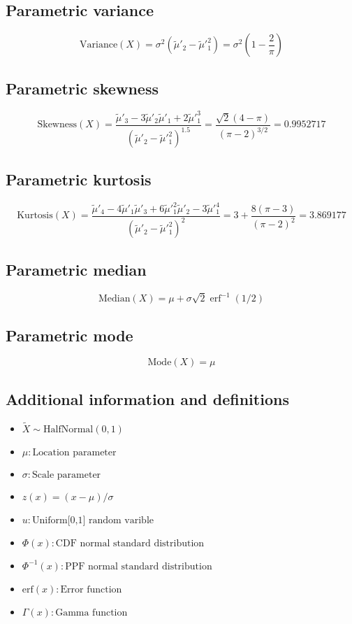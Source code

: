 \documentclass{article}
\begin{document}
\subsection{Parametric variance}
\begin{equation*} \mathrm{Variance}(X)=\sigma^{2}(\tilde{\mu}'_{2}-\tilde{\mu}'^{2}_{1})=\sigma^2\left(1-\frac 2 \pi\right) \end{equation*}
\subsection{Parametric skewness}
\begin{equation*} \mathrm{Skewness}(X)=\frac{\tilde{\mu}'_{3}-3\tilde{\mu}'_{2}\tilde{\mu}'_{1}+2\tilde{\mu}'^{3}_{1}}{(\tilde{\mu}'_{2}-\tilde{\mu}'^{2}_{1})^{1.5}}=\frac{\sqrt{2}(4-\pi)}{(\pi-2)^{3/2}}=0.9952717 \end{equation*}
\subsection{Parametric kurtosis}
\begin{equation*} \mathrm{Kurtosis}(X)=\frac{\tilde{\mu}'_{4}-4\tilde{\mu}'_{1}\tilde{\mu}'_{3}+6\tilde{\mu}'^{2}_{1}\tilde{\mu}'_{2}-3\tilde{\mu}'^{4}_{1}}{(\tilde{\mu}'_{2}-\tilde{\mu}'^{2}_{1})^{2}}=3+\frac{8(\pi-3)}{(\pi-2)^2}= 3.869177 \end{equation*}
\subsection{Parametric median}
\begin{equation*} \mathrm{Median}(X)=\mu+\sigma\sqrt{2}\operatorname{erf}^{-1}(1/2) \end{equation*}
\subsection{Parametric mode}
\begin{equation*} \mathrm{Mode}(X)=\mu \end{equation*}
\subsection{Additional information and definitions}
\begin{itemize}
    \item $ \tilde{X}\sim\mathrm{HalfNormal}\left(0,1\right) $
    \item $ \mu:\text{Location parameter} $
    \item $ \sigma:\text{Scale parameter} $
    \item $ z\left(x\right)=\left(x-\mu\right)/\sigma $
    \item $ u:\text{Uniform[0,1] random varible} $
    \item $ \Phi\left(x\right):\text{CDF normal standard distribution} $
    \item $ \Phi^{-1}\left(x\right):\text{PPF normal standard distribution} $
    \item $ \mathrm{erf}(x):\text{Error function} $
    \item $ \Gamma\left(x\right):\text{Gamma function} $
\end{itemize}
\end{document}
